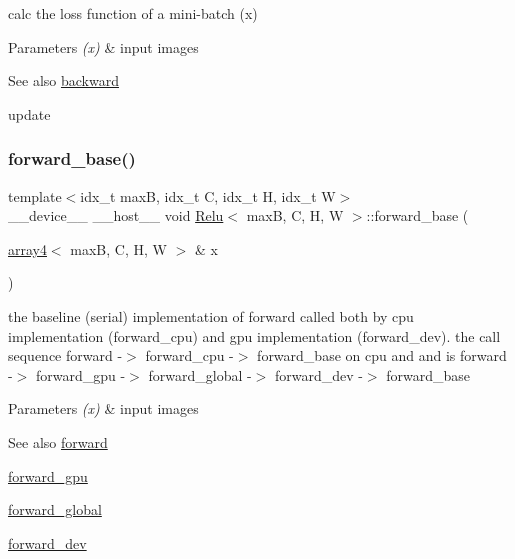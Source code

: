 calc the loss function of a mini-\/batch (x) 


\begin{DoxyParams}{Parameters}
{\em (x)} & input images \\
\hline
\end{DoxyParams}
\begin{DoxySeeAlso}{See also}
\hyperlink{structRelu_af9d3182c5103542c1c9796edc449847c}{backward} 

update 
\end{DoxySeeAlso}
\mbox{\label{structRelu_a41981da3c54691ae68933d5802a6518b}} 
\subsubsection{\texorpdfstring{forward\+\_\+base()}{forward\_base()}}
{\footnotesize\ttfamily template$<$idx\+\_\+t maxB, idx\+\_\+t C, idx\+\_\+t H, idx\+\_\+t W$>$ \\
\+\_\+\+\_\+device\+\_\+\+\_\+ \+\_\+\+\_\+host\+\_\+\+\_\+ void \hyperlink{structRelu}{Relu}$<$ maxB, C, H, W $>$\+::forward\+\_\+base (\begin{DoxyParamCaption}\item[{\hyperlink{structarray4}{array4}$<$ maxB, C, H, W $>$ \&}]{x }\end{DoxyParamCaption})\hspace{0.3cm}{\ttfamily [inline]}}



the baseline (serial) implementation of forward called both by cpu implementation (forward\+\_\+cpu) and gpu implementation (forward\+\_\+dev). the call sequence forward -\/$>$ forward\+\_\+cpu -\/$>$ forward\+\_\+base on cpu and and is forward -\/$>$ forward\+\_\+gpu -\/$>$ forward\+\_\+global -\/$>$ forward\+\_\+dev -\/$>$ forward\+\_\+base 


\begin{DoxyParams}{Parameters}
{\em (x)} & input images \\
\hline
\end{DoxyParams}
\begin{DoxySeeAlso}{See also}
\hyperlink{structRelu_a71f8322b10508a210025151ad788226f}{forward} 

\hyperlink{structRelu_a555ae5bc02822f294cac68cf3fe94e84}{forward\+\_\+gpu} 

\hyperlink{softmaxcrossentropy_8h_a578aeeb166bd06e800d9b396eab48b35}{forward\+\_\+global} 

\hyperlink{structRelu_aba6323a49a9e24b29bbb18b27707bae8}{forward\+\_\+dev} 
\end{DoxySeeAlso}
\mbox{\label{structRelu_a767ca23ba58264771274f2e5e51ae4ce}} 
